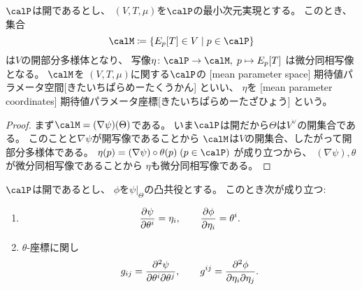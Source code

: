 \documentclass[report]{jlreq}
\begin{document}
\begin{propdef}[期待値パラメータ空間]
    $\calP$は開であるとし、
    $(V, T, \mu)$を$\calP$の最小次元実現とする。
    このとき、集合
    \begin{equation}
        \calM
            \coloneqq
                \mybrace{
                    E_p[T] \in V
                    \mid
                    p \in \calP
                }
    \end{equation}
    は$V$の開部分多様体となり、
    写像$\eta \colon \calP \to \calM, \; p \mapsto E_p[T]$
    は微分同相写像となる。
    $\calM$を
    $(V, T, \mu)$に関する$\calP$の
    [mean parameter space]
        {期待値パラメータ空間}[きたいちぱらめーたくうかん]
    といい、
    $\eta$を
    [mean parameter coordinates]
        {期待値パラメータ座標}[きたいちぱらめーたざひょう]
    という。
\end{propdef}

\begin{proof}
    まず$\calM = (\nabla \psi)(\Theta)$である。
    いま$\calP$は開だから$\Theta$は$V^\vee$の開集合である。
    このことと$\nabla \psi$が開写像であることから
    $\calM$は$V$の開集合、したがって開部分多様体である。
    $\eta(p) = (\nabla \psi) \circ \theta(p) \; (p \in \calP)$
    が成り立つから、
    $(\nabla \psi), \theta$が微分同相写像であることから
    $\eta$も微分同相写像である。
\end{proof}

\begin{proposition}
    $\calP$は開であるとし、
    $\phi$を$\psi|_\Theta$の凸共役とする。
    このとき次が成り立つ:
    \begin{enumerate}
        \item
            \begin{equation}
                \deldel[\psi]{\theta^i} = \eta_i,
                    \qquad
                    \deldel[\phi]{\eta_i} = \theta^i.
            \end{equation}
        \item $\theta$-座標に関し
            \begin{equation}
                g_{ij}
                    =
                        \frac{
                            \partial^2 \psi
                        }{
                            \partial \theta^i
                            \partial \theta^j
                        },
                        \qquad
                g^{ij}
                    =
                        \frac{
                            \partial^2 \phi
                        }{
                            \partial \eta_i
                            \partial \eta_j
                        }.
            \end{equation}
    \end{enumerate}
\end{proposition}
\end{document}
